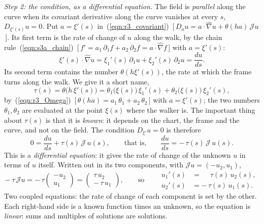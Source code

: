 \emph{Step 2: the condition, as a differential equation.} The field is \emph{parallel} along the curve when its covariant derivative along the curve vanishes at every $s$, $D_{\xi'(s)}u = 0$. Put $a = \xi'(s)$ in~(\ref{eqn:r3_covariant})~[\,$D_au = a\cdot\hat\nabla u + \theta(ha)\,\mathcal J u$\,]. Its first term is the rate of change of $u$ along the walk, by the chain rule~(\ref{eqn:s3a_chain})~[\,$f' = a_1\,\partial_1 f + a_2\,\partial_2 f = a\cdot\hat\nabla f$\,] with $a = \xi'(s)$:
\begin{equation*}
\xi'(s)\cdot\hat\nabla u = \xi_1'(s)\,\partial_1u + \xi_2'(s)\,\partial_2u = \frac{du}{ds} .
\end{equation*}
Its second term contains the number $\theta(h\xi'(s))$, the rate at which the frame turns along the walk. We give it a short name,
\begin{equation}
\label{eqn:r3_turn_rate}
\tau(s) = \theta\big(h\,\xi'(s)\big) = \theta_1\big(\xi(s)\big)\,\xi_1'(s) + \theta_2\big(\xi(s)\big)\,\xi_2'(s) ,
\end{equation}
by~(\ref{eqn:r3_Omega})~[\,$\theta(ha) = a_1\,\theta_1 + a_2\,\theta_2$\,] with $a = \xi'(s)$; the two numbers $\theta_1, \theta_2$ are evaluated at the point $\xi(s)$ where the walker is. The important thing about $\tau(s)$ is that it is \emph{known}: it depends on the chart, the frame and the curve, and not on the field. The condition $D_{\xi'}u = 0$ is therefore
\begin{equation*}
0 = \frac{du}{ds} + \tau(s)\,\mathcal J\,u(s), \qquad\text{that is,}\qquad \frac{du}{ds} = -\,\tau(s)\,\mathcal J\,u(s) .
\end{equation*}
This is a \emph{differential equation}: it gives the rate of change of the unknown $u$ in terms of $u$ itself. Written out in its two components, with $\mathcal J u = (-u_2, u_1)$,
\begin{equation*}
-\,\tau\,\mathcal J u = -\,\tau\begin{pmatrix} -u_2 \\ u_1 \end{pmatrix} = \begin{pmatrix} \tau\, u_2 \\ -\,\tau\, u_1 \end{pmatrix}, \qquad\text{so}\qquad
\begin{aligned}
u_1'(s) &= \phantom{-}\tau(s)\, u_2(s), \\
u_2'(s) &= -\,\tau(s)\, u_1(s) .
\end{aligned}
\end{equation*}
Two coupled equations: the rate of change of each component is set by the other. Each right-hand side is a known function times an unknown, so the equation is \emph{linear}: sums and multiples of solutions are solutions.

